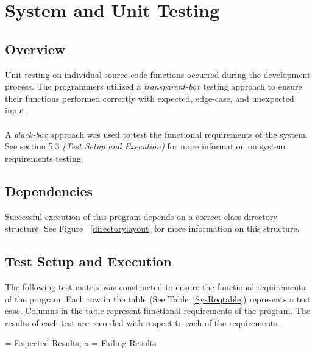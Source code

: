
\chapter{System  and Unit Testing}

\section{Overview}
Unit testing on individual source code functions occurred during the development process. The programmers utilized a {\it transparent-box} testing approach to ensure their functions performed correctly with expected, edge-case, and unexpected input.\\\\
A {\it black-box} approach was used to test the functional requirements of the system. See section 5.3 {\it (Test Setup and Execution)} for more information on system requirements testing.

\section{Dependencies}
Successful execution of this program depends on a correct class directory structure. See Figure ~\ref{directorylayout} for more information on this structure.


\section{Test Setup and Execution}
The following test matrix was constructed to ensure the functional requirements of the program. Each row in the table (See Table~\ref{SysReqtable}) represents a test case. Columns in the table represent functional requirements of the program. The results of each test are recorded with respect to each of the requirements.
\pagebreak
\begin{center}
\checkmark = Expected Results, x = Failing Results
\end{center}

